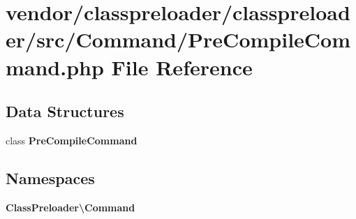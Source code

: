 \section{vendor/classpreloader/classpreloader/src/\+Command/\+Pre\+Compile\+Command.php File Reference}
\label{_pre_compile_command_8php}
\subsection*{Data Structures}
\begin{DoxyCompactItemize}
\item 
class {\bf Pre\+Compile\+Command}
\end{DoxyCompactItemize}
\subsection*{Namespaces}
\begin{DoxyCompactItemize}
\item 
 {\bf Class\+Preloader\textbackslash{}\+Command}
\end{DoxyCompactItemize}
